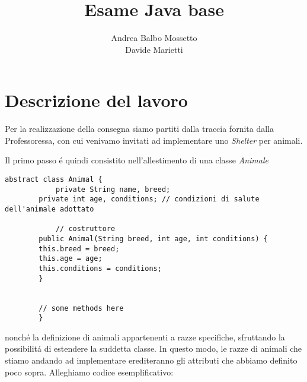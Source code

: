 \documentclass{article}
\title{Esame Java base}
\author{Andrea Balbo Mossetto \\ Davide Marietti}
\date{}
\begin{document}
	\maketitle
	\newpage
	
	\tableofcontents
	\newpage
	
	\lstlistoflistings
	\newpage
	
	
	\section{Descrizione del lavoro}
	
	Per la realizzazione della consegna siamo partiti dalla traccia fornita dalla Professoressa, con cui venivamo invitati ad implementare uno \textit{Shelter} per animali. 
	
	Il primo passo \'e quindi consistito nell'allestimento di una classe \textit{Animale}
	
	\begin{lstlisting}[caption={Allestimento della classe Animale}]
		abstract class Animal {
		 	private String name, breed;
   		private int age, conditions; // condizioni di salute dell'animale adottato

			// costruttore
   		public Animal(String breed, int age, int conditions) {
      	this.breed = breed;
      	this.age = age;
      	this.conditions = conditions;
   		}

		
		// some methods here 
		}
	\end{lstlisting}
	
	nonch\'e la definizione di animali appartenenti a razze specifiche, sfruttando la possibilit\'a di estendere la suddetta classe. In questo modo, le razze di animali che stiamo andando ad implementare erediteranno gli attributi che abbiamo definito poco sopra. Alleghiamo codice esemplificativo:
	
\end{document}

